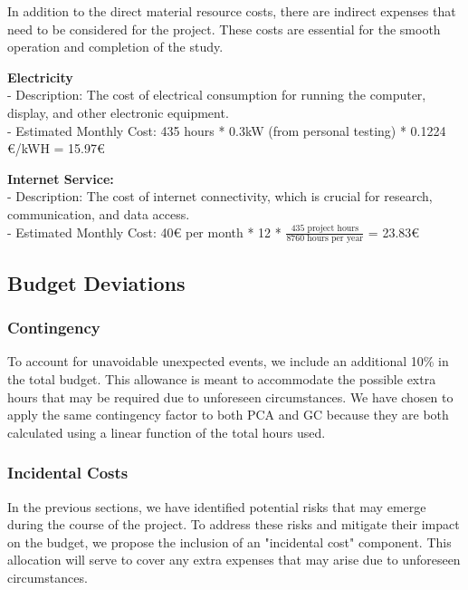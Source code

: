 In addition to the direct material resource costs, there are indirect expenses that need to be considered for the project. These costs are essential for the smooth operation and completion of the study.
\begin{list}{}{}
\item \textbf{Electricity}\\
   - Description: The cost of electrical consumption for running the computer, display, and other electronic equipment.\\
   - Estimated Monthly Cost: 435 hours * 0.3kW (from personal testing) * 0.1224 €/kWH \cite{priceKWH} = 15.97€

\item \textbf{Internet Service:}\\
   - Description: The cost of internet connectivity, which is crucial for research, communication, and data access.\\
   - Estimated Monthly Cost: 40€ per month \cite{priceinternet} * 12 * $\frac{435 \text{ project hours}}{8760 \text{ hours per year}}$ = 23.83€

\end{list}

\subsection{Budget Deviations}

\subsubsection{Contingency}

To account for unavoidable unexpected events, we include an additional 10\% in the total budget. This allowance is meant to accommodate the possible extra hours that may be required due to unforeseen circumstances.
We have chosen to apply the same contingency factor to both PCA and GC because they are both calculated using a linear function of the total hours used.

\subsubsection{Incidental Costs}

In the previous sections, we have identified potential risks that may emerge during the course of the project. To address these risks and mitigate their impact on the budget, we propose the inclusion of an "incidental cost" component. This allocation will serve to cover any extra expenses that may arise due to unforeseen circumstances. 

